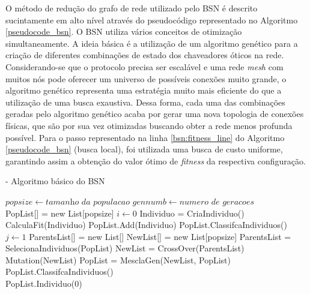 \documentclass[12pt]{article}
\begin{document}
O método de redução do grafo de rede utilizado pelo BSN é descrito sucintamente em alto nível através do pseudocódigo representado no Algoritmo \ref{pseudocode_bsn}. O BSN utiliza vários conceitos de otimização simultaneamente. A ideia básica é a utilização de um algoritmo genético para a criação de diferentes combinações de estado dos chaveadores óticos na rede. Considerando-se que o protocolo precisa ser escalável e uma rede \emph{mesh} com muitos nós pode oferecer um universo de possíveis conexões muito grande, o algoritmo genético representa uma estratégia muito mais eficiente do que a utilização de uma busca exaustiva. Dessa forma, cada uma das combinações geradas pelo algoritmo genético acaba por gerar uma nova topologia de conexões físicas, que são por sua vez otimizadas buscando obter a rede menos profunda possível. Para o passo representado na linha \ref{bsn:fitness_line} do Algoritmo \ref{pseudocode_bsn} (busca local), foi utilizada uma busca de custo uniforme, garantindo assim a obtenção do valor ótimo de \emph{fitness} da respectiva configuração.

\begin{algorithm} [h]
\caption{ - Algoritmo básico do BSN}
\begin{algorithmic}[1]
\State $popsize\gets \textit{tamanho da populacao}$
\State $gennumb\gets \textit{numero de geracoes}$\\
\State PopList[] = new List[popsize]
\State $i\gets 0$
\State Individuo = CriaIndividuo()
\State CalculaFit(Individuo)\label{bsn:fitness_line}
\State PopList.Add(Individuo)
\State PopList.ClassifcaIndividuos()
\EndWhile{}\\
\State $j\gets 1$
\State ParentsList[] = new List[]
\State NewList[] = new List[popsize]
\State ParentsList = SelecionaIndividuos(PopList)
\State NewList = CrossOver(ParentsList)
\State Mutation(NewList)
\State PopList = MesclaGen(NewList, PopList)
\State PopList.ClassifcaIndividuos()
\EndWhile\\
\State\Return PopList.Individuo(0)
\end{algorithmic}
\label{pseudocode_bsn}
\end{algorithm}
\end{document}

